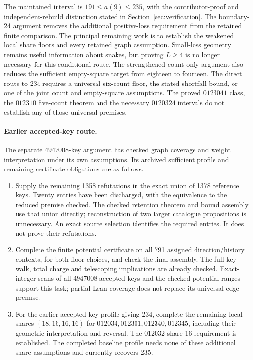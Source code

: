 \documentclass[11pt,a4paper]{article}
\theoremstyle{definition}
\theoremstyle{remark}
\begin{document}
The maintained interval is $191\le a(9)\le235$, with the contributor-proof
and independent-rebuild distinction stated in Section~\ref{sec:verification}.
The boundary-24 argument removes the additional positive-loss requirement
from the retained finite comparison. The principal remaining work is to
establish the weakened local share floors and every retained graph
assumption. Small-loss geometry remains useful information about snakes,
but proving $L\ge4$ is no longer necessary for this conditional route.
The strengthened count-only argument also reduces the sufficient
empty-square target from eighteen to fourteen.
The direct route to 234 requires a universal six-count floor, the stated
shortfall bound, or one of the joint count and empty-square assumptions.
The proved $0123041$ class, the $012310$ five-count theorem and the necessary
$0120324$ intervals do not establish any of those universal premises.
\paragraph{Earlier accepted-key route.}
The separate 4947008-key argument has checked graph coverage and weight
interpretation under its own assumptions. Its archived sufficient
profile and remaining certificate obligations are as follows.

\begin{enumerate}
\item Supply the remaining 1358 refutations in the exact union of 1378
reference keys. Twenty entries have been discharged, with the equivalence
to the reduced premise checked. The checked retention theorem and bound assembly use that
union directly; reconstruction of two larger catalogue propositions is
unnecessary. An exact source selection identifies the required entries.
It does not prove their refutations.
\item Complete the finite potential certificate on all 791 assigned
direction/history contexts, for both floor choices, and check the final
assembly. The full-key walk, total charge and telescoping implications
are already checked. Exact-integer scans of all 4947008 accepted keys and
the checked potential ranges support this task; partial Lean coverage
does not replace its universal edge premise.
\item For the earlier accepted-key profile giving 234, complete the remaining local shares
$(18,16,16,16)$ for $012034,012301,012340,012345$, including
their geometric interpretation and reversal. The $012032$ share-16
requirement is established. The completed baseline profile needs none
of these additional share assumptions and currently recovers 235.
\end{enumerate}
\end{document}

